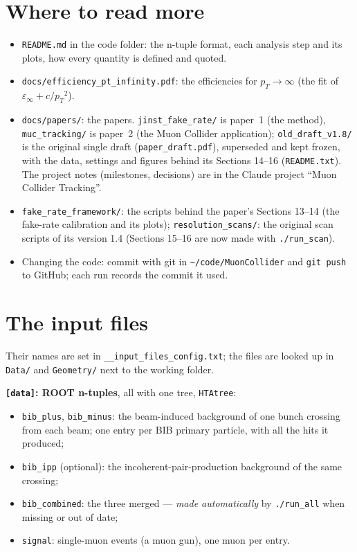 \documentclass[11pt,letterpaper]{article}
\newcommand{\code}[1]{\texttt{#1}}
\newcommand{\pT}{\ensuremath{p_T}}
\newcommand{\inputs}{\code{\_\_input\_files\_config.txt}}
\begin{document}
\section{Where to read more}
\begin{itemize}[leftmargin=1.2em]
\item \code{README.md} in the code folder: the n-tuple format, each
  analysis step and its plots, how every quantity is defined and quoted.
\item \code{docs/efficiency\_pt\_infinity.pdf}: the efficiencies for
  $\pT\to\infty$ (the fit of $\varepsilon_\infty + c/\pT^2$).
\item \code{docs/papers/}: the papers. \code{jinst\_fake\_rate/} is paper~1
  (the method), \code{muc\_tracking/} is paper~2 (the Muon Collider
  application); \code{old\_draft\_v1.8/} is the original single draft
  (\code{paper\_draft.pdf}), superseded and kept frozen, with the data,
  settings and figures behind its Sections 14--16 (\code{README.txt}). The project notes (milestones,
  decisions) are in the Claude project ``Muon Collider Tracking''.
\item \code{fake\_rate\_framework/}: the scripts behind the paper's
  Sections 13--14 (the fake-rate calibration and its plots);
  \code{resolution\_scans/}: the original scan scripts of its version 1.4
  (Sections 15--16 are now made with \code{./run\_scan}).
\item Changing the code: commit with git in \code{\textasciitilde/code/MuonCollider}
  and \code{git push} to GitHub; each run records the commit it used.
\end{itemize}

\appendix
\section{The input files}\label{app:inputs}
Their names are set in \inputs; the files are looked up in \code{Data/}
and \code{Geometry/} next to the working folder.

\textbf{\code{[data]}: ROOT n-tuples}, all with one tree, \code{HTAtree}:
\begin{itemize}[leftmargin=1.2em]
\item \code{bib\_plus}, \code{bib\_minus}: the beam-induced background of
  one bunch crossing from each beam; one entry per BIB primary particle,
  with all the hits it produced;
\item \code{bib\_ipp} (optional): the incoherent-pair-production background
  of the same crossing;
\item \code{bib\_combined}: the three merged --- \emph{made automatically}
  by \code{./run\_all} when missing or out of date;
\item \code{signal}: single-muon events (a muon gun), one muon per entry.
\end{itemize}
\end{document}
